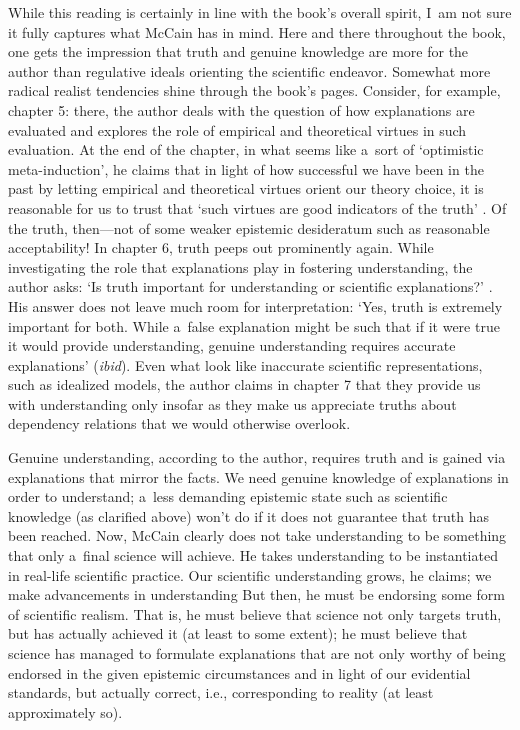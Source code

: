 While this reading is certainly in line with the book's overall spirit, I~am not sure it fully captures what McCain has in mind. Here and there throughout the book, one gets the impression that truth and genuine knowledge are more for the author than regulative ideals orienting the scientific endeavor. Somewhat more radical realist tendencies shine through the book's pages. Consider, for example, chapter 5: there, the author deals with the question of how explanations are evaluated and explores the role of empirical and theoretical virtues in such evaluation. At the end of the chapter, in what seems like a~sort of ‘optimistic meta-induction', he claims that in light of how successful we have been in the past by letting empirical and theoretical virtues orient our theory choice, it is reasonable for us to trust that ‘such virtues are good indicators of the truth'
\parencite[][p.68]{mccain_understanding_2022}. %
 Of the truth, then---not of some weaker epistemic desideratum such as reasonable acceptability! In chapter 6, truth peeps out prominently again. While investigating the role that explanations play in fostering understanding, the author asks: ‘Is truth important for understanding or scientific explanations?' 
\parencite[][p.78]{mccain_understanding_2022}. %
 His answer does not leave much room for interpretation: ‘Yes, truth is extremely important for both. While a~false explanation might be such that if it were true it would provide understanding, genuine understanding requires accurate explanations' (\textit{ibid}). Even what look like inaccurate scientific representations, such as idealized models, the author claims in chapter 7 that they provide us with understanding only insofar as they make us appreciate truths about dependency relations that we would otherwise overlook.

Genuine understanding, according to the author, requires truth and is gained via explanations that mirror the facts. We need genuine knowledge of explanations in order to understand; a~less demanding epistemic state such as scientific knowledge (as clarified above) won't do if it does not guarantee that truth has been reached. Now, McCain clearly does not take understanding to be something that only a~final science will achieve. He takes understanding to be instantiated in real-life scientific practice. Our scientific understanding grows, he claims; we make advancements in understanding
 But then, he must be endorsing some form of scientific realism. That is, he must believe that science not only targets truth, but has actually achieved it (at least to some extent); he must believe that science has managed to formulate explanations that are not only worthy of being endorsed in the given epistemic circumstances and in light of our evidential standards, but actually correct, i.e., corresponding to reality (at least approximately so).


